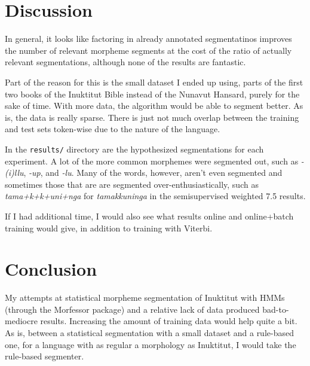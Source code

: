 \documentclass[10pt]{article}
\begin{document}
\section{Discussion}
In general, it looks like factoring in already annotated segmentatinos improves the number of relevant morpheme segments at the cost of the ratio of actually relevant segmentations, although none of the results are fantastic.

Part of the reason for this is the small dataset I ended up using, parts of the first two books of the Inuktitut Bible instead of the Nunavut Hansard, purely for the sake of time. With more data, the algorithm would be able to segment better. As is, the data is really sparse. There is just not much overlap between the training and test sets token-wise due to the nature of the language.

In the \texttt{results/} directory are the hypothesized segmentations for each experiment. A lot of the more common morphemes were segmented out, such as \textit{-(i)llu}, \textit{-up}, and \textit{-lu}. Many of the words, however, aren't even segmented and sometimes those that are are segmented over-enthusiastically, such as \textit{tama+k+k+uni+nga} for \textit{tamakkuninga} in the semisupervised weighted 7.5 results.


If I had additional time, I would also see what results online and online+batch training would give, in addition to training with Viterbi.

\section{Conclusion}
My attempts at statistical morpheme segmentation of Inuktitut with HMMs (through the Morfessor package) and a relative lack of data produced bad-to-mediocre results. Increasing the amount of training data would help quite a bit. As is, between a statistical segmentation with a small dataset and a rule-based one, for a language with as regular a morphology as Inuktitut, I would take the rule-based segmenter.

\pagebreak


\end{document}
